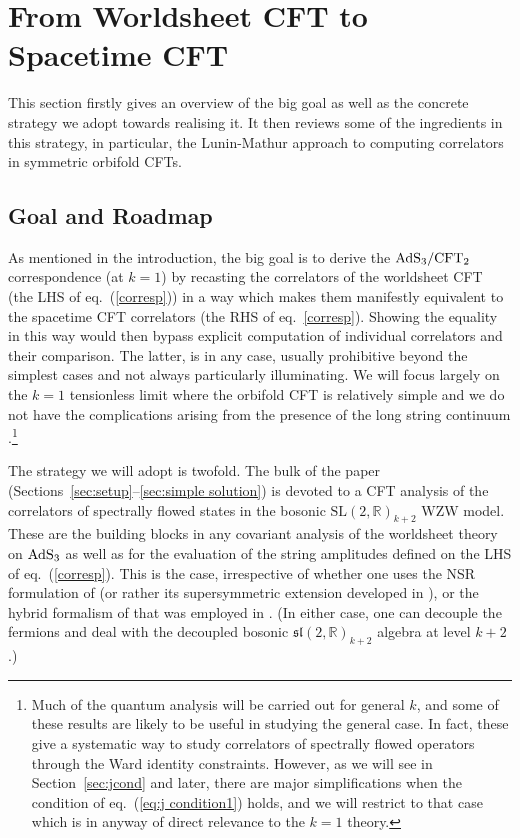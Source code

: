 \documentclass[12pt,a4paper]{article}
\begin{document}
\section{From Worldsheet CFT to Spacetime CFT}\label{sec:overview}

This section firstly gives an overview of the big goal as well as the concrete 
strategy we adopt towards realising it. It then reviews some of the ingredients in this strategy, in particular, the Lunin-Mathur approach to computing correlators in symmetric orbifold CFTs. 

\subsection{Goal and Roadmap}\label{sec:Goal}

As mentioned in the introduction, the big goal is to derive the ${\rm AdS}_3/{\rm CFT}_2$ correspondence (at $k=1$) by recasting the correlators of the worldsheet CFT (the LHS of eq.~(\ref{corresp})) in a way which makes them manifestly equivalent to the spacetime CFT correlators (the RHS of eq.~\eqref{corresp}). Showing the equality in this way would then bypass explicit computation of individual correlators and their comparison. The latter, is in any case, usually prohibitive beyond the simplest cases and not always particularly illuminating. We will focus largely on the $k=1$ tensionless limit where the orbifold CFT is relatively simple and we do not have the complications arising from the presence of the long string continuum \cite{Seiberg:1999xz, Maldacena:2000hw}.\footnote{Much of the quantum analysis will be carried out for general $k$, and some of these results are likely to be useful in studying the general case. In fact, these give a systematic way to study correlators of spectrally flowed operators through the Ward identity constraints. However, as we will see in Section~\ref{sec:jcond} and later, there are major simplifications when the condition of eq.~(\ref{eq:j condition1}) holds, and we will restrict to that case which is in anyway of direct relevance to the $k=1$ theory.}

The strategy we will adopt is twofold. The bulk of the paper (Sections~\ref{sec:setup}--\ref{sec:simple solution}) is devoted to a CFT analysis of the  
correlators of spectrally flowed states in the bosonic $\mathrm{SL}(2, \mathds{R})_{k+2}$  WZW model. These are the building blocks in any covariant analysis of the worldsheet theory on 
${\rm AdS}_3$ as well as for the evaluation of the string amplitudes defined on the LHS of eq.~(\ref{corresp}). 
This is the case, irrespective of whether one uses the NSR formulation of \cite{Maldacena:2000hw,Maldacena:2000kv,Maldacena:2001km} (or rather its supersymmetric extension developed in \cite{Giveon:1998ns,Israel:2003ry,Raju:2007uj,Ferreira:2017pgt}), or the hybrid formalism of \cite{Berkovits:1999im} that was employed in \cite{Eberhardt:2018ouy}. (In either case, one can decouple the fermions and deal with the decoupled bosonic $\mathfrak{sl}(2, \mathds{R})_{k+2}$ algebra at level $k+2$.)
\end{document}
